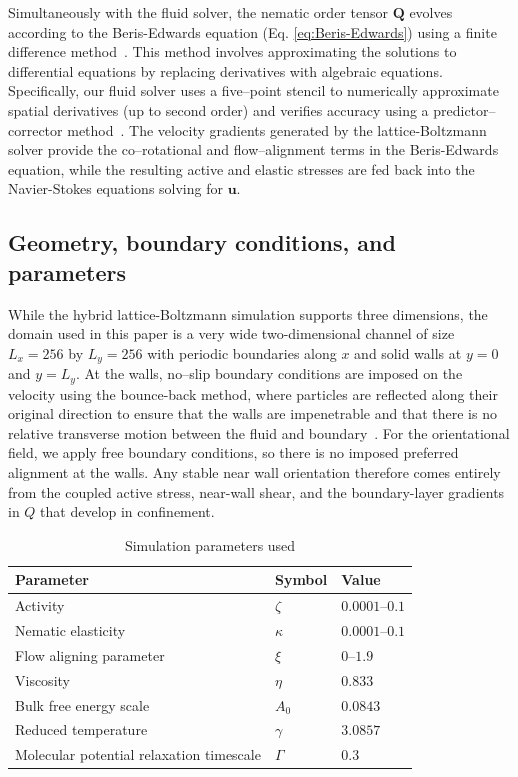 \documentclass[11pt]{article}
\begin{document}
Simultaneously with the fluid solver, the nematic order tensor $\mathbf{Q}$ evolves according to the Beris-Edwards equation (Eq. \eqref{eq:Beris-Edwards}) using a finite difference method~\cite{marenduzzo2007steady}. This method involves approximating the solutions to differential equations by replacing derivatives with algebraic equations. Specifically, our fluid solver uses a five--point stencil to numerically approximate spatial derivatives (up to second order) and verifies accuracy using a predictor--corrector method~\cite{Bhattacharyya2024ActiveNematicsMechanobiology, Li2017NumericalSolutionPDE, Dubois2017LBMFiniteDifference}. The velocity gradients generated by the lattice-Boltzmann solver provide the co--rotational and flow--alignment terms in the Beris-Edwards equation, while the resulting active and elastic stresses are fed back into the Navier-Stokes equations solving for $\mathbf{u}$.

\subsection{Geometry, boundary conditions, and parameters}
\label{sec:geometry_BC_parameters}

While the hybrid lattice-Boltzmann simulation supports three dimensions, the domain used in this paper is a very wide two-dimensional channel of size $L_x = 256$ by $L_y = 256$ with periodic boundaries along $x$ and solid walls at $y=0$ and $y=L_y$. At the walls, no--slip boundary conditions are imposed on the velocity using the bounce-back method, where particles are reflected along their original direction to ensure that the walls are impenetrable and that there is no relative transverse motion between the fluid and boundary~\cite{Krueger2016LatticeBoltzmann}. For the orientational field, we apply free boundary conditions, so there is no imposed preferred alignment at the walls. Any stable near wall orientation therefore comes entirely from the coupled active stress, near-wall shear, and the boundary-layer gradients in $Q$ that develop in confinement.

\begin{table}
\vspace{-1cm}
\centering
\small
\setlength{\tabcolsep}{4pt}
\renewcommand{\arraystretch}{1.1}
\caption{Simulation parameters used}
\label{table:parameters}
\begin{tabular}{@{}p{} l l@{}}
\hline
Parameter & Symbol & Value \\
\hline
Activity & $\zeta$ & $0.0001$--$0.1$ \\
Nematic elasticity & $\kappa$ & $0.0001$--$0.1$ \\
Flow aligning parameter & $\xi$ & $0$--$1.9$ \\
Viscosity & $\eta$ & $0.833$ \\
Bulk free energy scale & $A_0$ & $0.0843$ \\
Reduced temperature & $\gamma$ & $3.0857$ \\
Molecular potential relaxation timescale & $\Gamma$ & {$0.3$} \\
\hline
\end{tabular}
\end{table}
\end{document}

